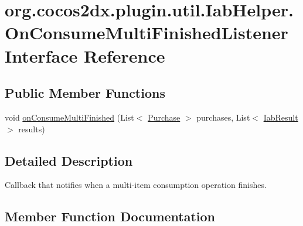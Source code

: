 \hypertarget{interfaceorg_1_1cocos2dx_1_1plugin_1_1util_1_1IabHelper_1_1OnConsumeMultiFinishedListener}{}\section{org.\+cocos2dx.\+plugin.\+util.\+Iab\+Helper.\+On\+Consume\+Multi\+Finished\+Listener Interface Reference}
\label{interfaceorg_1_1cocos2dx_1_1plugin_1_1util_1_1IabHelper_1_1OnConsumeMultiFinishedListener}
\subsection*{Public Member Functions}
\begin{DoxyCompactItemize}
\item 
void \hyperlink{interfaceorg_1_1cocos2dx_1_1plugin_1_1util_1_1IabHelper_1_1OnConsumeMultiFinishedListener_a8c476276661c6ad6bd50823c4e421fb0}{on\+Consume\+Multi\+Finished} (List$<$ \hyperlink{classorg_1_1cocos2dx_1_1plugin_1_1util_1_1Purchase}{Purchase} $>$ purchases, List$<$ \hyperlink{classorg_1_1cocos2dx_1_1plugin_1_1util_1_1IabResult}{Iab\+Result} $>$ results)
\end{DoxyCompactItemize}


\subsection{Detailed Description}
Callback that notifies when a multi-\/item consumption operation finishes. 

\subsection{Member Function Documentation}
\mbox{\label{interfaceorg_1_1cocos2dx_1_1plugin_1_1util_1_1IabHelper_1_1OnConsumeMultiFinishedListener_a8c476276661c6ad6bd50823c4e421fb0}} 
